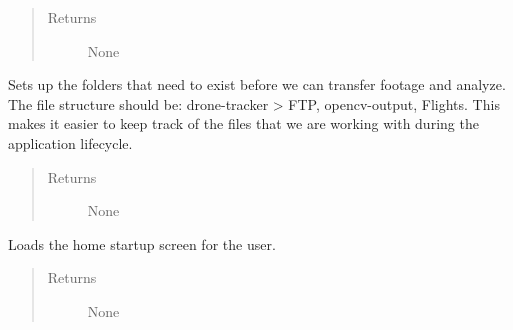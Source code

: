 \documentclass[letterpaper,10pt,english]{sphinxmanual}
\begin{document}
\begin{fulllineitems}
\begin{fulllineitems}
\begin{quote}
\begin{description}
\item[{Returns}] \leavevmode
None

\end{description}\end{quote}

\end{fulllineitems}


\begin{fulllineitems}
\label{\detokenize{index:src.Controllers.Program_Controller.Controller.setupFileStructure}}
Sets up the folders that need to exist before we can transfer footage and analyze. The file structure
should be: drone-tracker \textgreater{} FTP, opencv-output, Flights. This makes it easier to keep track of
the files that we are working with during the application lifecycle.
\begin{quote}\begin{description}
\item[{Returns}] \leavevmode
None

\end{description}\end{quote}

\end{fulllineitems}


\begin{fulllineitems}
\label{\detokenize{index:src.Controllers.Program_Controller.Controller.show_home}}
Loads the home startup screen for the user.
\begin{quote}\begin{description}
\item[{Returns}] \leavevmode
None

\end{description}\end{quote}

\end{fulllineitems}



\end{fulllineitems}
\end{document}
